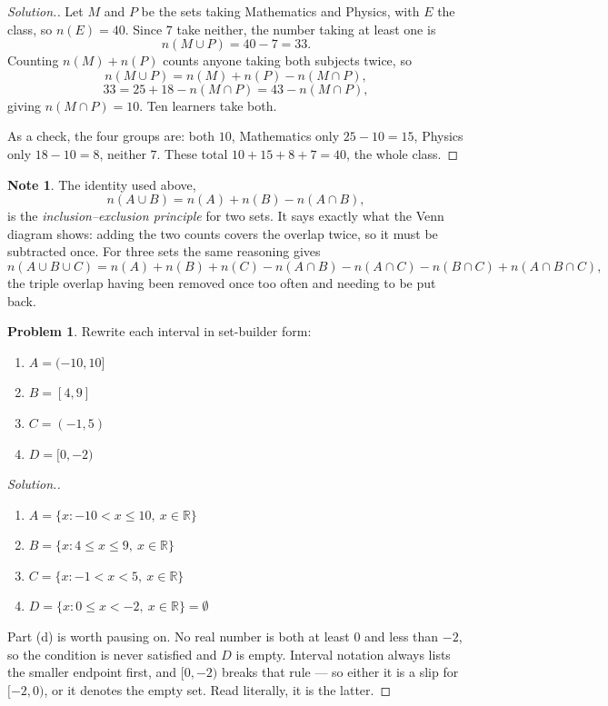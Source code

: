 \documentclass[11pt,a4paper]{article}
\theoremstyle{definition}
\newtheorem{note}[thm]{Note}
\newtheorem{problemx}{Problem}[section]
\newenvironment{problem}{\begin{problemx}}{\end{problemx}}
\newenvironment{solution}
  {\renewcommand{\qedsymbol}{}\begin{proof}[\textit{Solution}.]}
  {\end{proof}}
\begin{document}
\begin{solution}
Let $M$ and $P$ be the sets taking Mathematics and Physics, with $E$ the class, so
$n(E)=40$. Since $7$ take neither, the number taking at least one is
$$n(M\cup P)=40-7=33 .$$
Counting $n(M)+n(P)$ counts anyone taking both subjects twice, so
$$n(M\cup P)=n(M)+n(P)-n(M\cap P),$$
$$33=25+18-n(M\cap P)=43-n(M\cap P),$$
giving $n(M\cap P)=10$. Ten learners take both.

As a check, the four groups are: both $10$, Mathematics only $25-10=15$, Physics
only $18-10=8$, neither $7$. These total $10+15+8+7=40$, the whole class.
\end{solution}

\begin{note}
The identity used above,
$$n(A\cup B)=n(A)+n(B)-n(A\cap B),$$
is the \emph{inclusion--exclusion principle} for two sets. It says exactly what the
Venn diagram shows: adding the two counts covers the overlap twice, so it must be
subtracted once. For three sets the same reasoning gives
$$n(A\cup B\cup C)=n(A)+n(B)+n(C)-n(A\cap B)-n(A\cap C)-n(B\cap C)+n(A\cap B\cap C),$$
the triple overlap having been removed once too often and needing to be put back.
\end{note}

\begin{problem}
Rewrite each interval in set-builder form:
\begin{enumerate}
\item[(a).] $A = (-10,10]$
\item[(b).] $B = [4,9]$
\item[(c).] $C = (-1,5)$
\item[(d).] $D = [0,-2)$
\end{enumerate}
\end{problem}

\begin{solution}
\begin{enumerate}
\item[(a).] $A=\{x: -10<x\leq 10,\ x\in\mathbb{R}\}$
\item[(b).] $B=\{x: 4\leq x\leq 9,\ x\in\mathbb{R}\}$
\item[(c).] $C=\{x: -1<x<5,\ x\in\mathbb{R}\}$
\item[(d).] $D=\{x: 0\leq x<-2,\ x\in\mathbb{R}\}=\emptyset$
\end{enumerate}
Part (d) is worth pausing on. No real number is both at least $0$ and less than
$-2$, so the condition is never satisfied and $D$ is empty. Interval notation
always lists the smaller endpoint first, and $[0,-2)$ breaks that rule --- so
either it is a slip for $[-2,0)$, or it denotes the empty set. Read literally, it
is the latter.
\end{solution}
\end{document}
